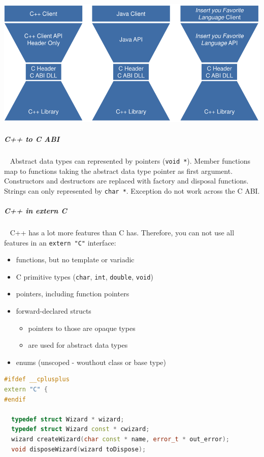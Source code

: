\documentclass[11pt,twoside,landscape]{article}
\begin{document}
\begin{multicols}{2}
{
\begin{center}
\includegraphics[width=.9\linewidth]{img/hourglass_interface.png}
\end{center}
\label{fig:hourglass-interface-idea}
}
\subparagraph{C++ to C ABI} \
\label{sec:org1bd1f16}
Abstract data types can represented by pointers (\texttt{void *}).
Member functions map to functions taking the abstract data type pointer as first argument.
Constructors and destructors are replaced with factory and disposal functions.
Strings can only represented by \texttt{char *}.
Exception do not work across the C ABI.

\subparagraph{C++ in extern C} \
\label{sec:org929b97f}
C++ has a lot more features than C has.
Therefore, you can not use all features in an \texttt{extern "C"} interface:

\begin{itemize}
\item functions, but no template or variadic
\item C primitive types (\texttt{char}, \texttt{int}, \texttt{double}, \texttt{void})
\item pointers, including function pointers
\item forward-declared structs
\begin{itemize}
\item pointers to those are opaque types
\item are used for abstract data types
\end{itemize}
\item enums (unscoped - wouthout class or base type)
\end{itemize}


\begin{lstlisting}[language=c++,label=lst:example-for-a-extern-c-interface,caption={Example for a extern C interface},captionpos=b,numbers=none]
#ifdef __cplusplus
extern "C" {
#endif

  typedef struct Wizard * wizard;
  typedef struct Wizard const * cwizard;
  wizard createWizard(char const * name, error_t * out_error);
  void disposeWizard(wizard toDispose);


\end{lstlisting}
\end{multicols}
\end{document}
